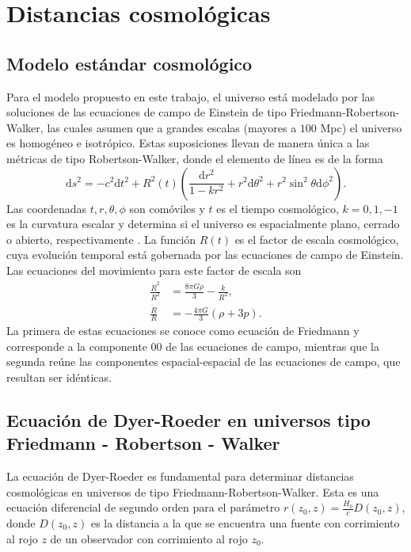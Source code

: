 \section{Distancias cosmológicas}
\subsection{Modelo estándar cosmológico}
Para el modelo propuesto en este trabajo, el universo está modelado por las soluciones de las ecuaciones de campo de Einstein de tipo Friedmann-Robertson-Walker, las cuales asumen que a grandes escalas (mayores a $100$ Mpc) el universo es homogéneo e isotrópico. Estas suposiciones llevan de manera única a las métricas de tipo Robertson-Walker, donde el elemento de línea es de la forma
\begin{equation}
\mathrm{d}s^2=-c^2\mathrm{d}t^2+R^2(t)\left(\frac{\mathrm{d}r^2}{1-kr^2}+r^2\mathrm{d}\theta^2+r^2\sin^2\theta\mathrm{d}\phi^2 \right).
\end{equation}
Las coordenadas $t,r,\theta,\phi$ son comóviles y $t$ es el tiempo cosmológico, $k=0,1,-1$ es la curvatura escalar y determina si el universo es espacialmente plano, cerrado o abierto, respectivamente \cite{castaneda}. La función $R(t)$ es el factor de escala cosmológico, cuya evolución temporal está gobernada por las ecuaciones de campo de Einstein. Las ecuaciones del movimiento para este factor de escala son
\begin{align}
\frac{\dot{R}^2}{R^2}&=\frac{8\pi G \rho}{3}-\frac{k}{R^2},\\
\frac{\ddot{R}}{R}&=-\frac{4\pi G}{3}\left( \rho+3p\right).
\end{align}
La primera de estas ecuaciones se conoce como ecuación de Friedmann y corresponde a la componente $00$ de las ecuaciones de campo, mientras que la segunda reúne las componentes espacial-espacial de las ecuaciones de campo, que resultan ser idénticas.

\subsection{Ecuación de Dyer-Roeder en universos tipo Friedmann - Robertson - Walker}
La ecuación de Dyer-Roeder es fundamental para determinar distancias cosmológicas en universos de tipo Friedmann-Robertson-Walker. Esta es una ecuación diferencial de segundo orden para el parámetro $r(z_0,z)=\frac{H_0}{c}D(z_0,z)$, donde $D(z_0,z)$ es la distancia a la que se encuentra una fuente con corrimiento al rojo $z$ de un observador con corrimiento al rojo $z_0$. 

